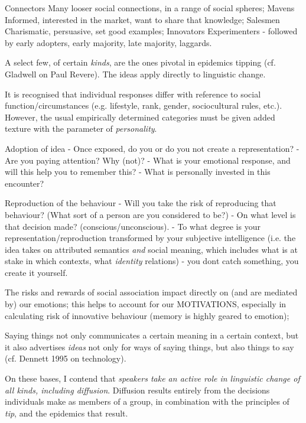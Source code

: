Connectors Many looser social connections, in a range of social spheres;
Mavens Informed, interested in the market, want to share that knowledge;
Salesmen Charismatic, persuasive, set good examples;
Innovators Experimenters - followed by early adopters, early majority, late majority, laggards.

A select few, of certain \textit{kinds}, are the ones pivotal in epidemics tipping (cf. Gladwell on Paul Revere). The ideas apply directly to linguistic change.

It is recognised that individual responses differ with reference to social function/circumstances (e.g. lifestyle, rank, gender, sociocultural rules, etc.). However, the usual empirically determined categories must be given added texture with the parameter of \textit{personality}.

Adoption of idea 
	- Once exposed, do you or do you not create a representation? 
	- Are you paying attention? Why (not)?
	- What is your emotional response, and will this help you to remember this?
	- What is personally invested in this encounter? 


Reproduction of the behaviour 
	- Will you take the risk of reproducing that behaviour? (What sort of a person are you considered to be?)
	- On what level is that decision made? (conscious/unconscious).
	- To what degree is your representation/reproduction transformed by your subjective intelligence (i.e. the idea takes on attributed semantics \textit{and }social meaning, which includes what is at stake in which contexts, what \textit{identity} relations) - you dont catch something, you create it yourself.



The risks and rewards of social association impact directly on (and are mediated by) our emotions; this helps to account for our MOTIVATIONS, especially in calculating risk of innovative behaviour (memory is highly geared to emotion); 

Saying things not only communicates a certain meaning in a certain context, but it also advertises \textit{ideas} not only for ways of saying things, but also things to say (cf. Dennett 1995 on technology).

On these bases, I contend that \textit{speakers take an active role in linguistic change of all kinds, including diffusion}. Diffusion results entirely from the decisions individuals make as members of a group, in combination with the principles of \textit{tip}, and the epidemics that result. 

